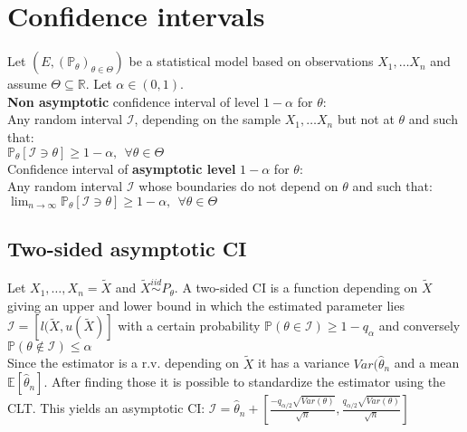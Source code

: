 \section{Confidence intervals}

Let $\displaystyle ( E,(\mathbb{P}_{\theta })_{\theta \in \Theta })$ be a statistical  model based on observations $X_{1} , \ldots X_{n}$  and assume $\displaystyle \Theta \subseteq \mathbb{R}$. Let $\displaystyle \alpha \in ( 0,1)$.\\

\textbf{Non asymptotic} confidence interval of level $\displaystyle 1-\alpha $ for $\displaystyle \theta $:\\

Any random interval $\displaystyle \mathcal{I}$, depending on the sample $X_{1} , \ldots X_{n}$ but not at $\displaystyle \theta $ and such that:\\

$\mathbb{P}_{\theta }[\mathcal{I} \ni \theta ] \geq 1-\alpha ,\ \ \forall \theta \in \Theta$\\

Confidence interval of \textbf{asymptotic level} $\displaystyle 1-\alpha $  for $\displaystyle \theta $:\\

Any random interval $\displaystyle \mathcal{I}$ whose boundaries do not depend on $\displaystyle \theta $ and such that:\\

$\lim _{n\rightarrow \infty }\mathbb{P}_{\theta } [\mathcal{I} \ni \theta ]\geq 1-\alpha ,\ \ \forall \theta \in \Theta $\\

\subsection*{Two-sided asymptotic CI}
Let $X_1, \ldots, X_n = \tilde{X}$ and $\tilde{X}\stackrel{iid} {\sim} P_{\theta}$. A two-sided CI is a function depending on $\tilde{X}$ giving an upper and lower bound in which the estimated parameter lies $\mathcal{I} = [l(\tilde{X},u(\tilde{X})]$ with a certain probability $\mathbb{P}(\theta \in  \mathcal{I}) \geq 1 -q_{\alpha}$ and conversely $\mathbb{P}(\theta \not\in  \mathcal{I}) \leq \alpha$\\

Since the estimator is a r.v. depending on $\tilde{X}$ it has a variance $Var(\hat{\theta}_n$ and a mean $\mathbb{E}[\hat{\theta}_n]$. After finding those it is possible to standardize the estimator using the CLT. This yields an asymptotic CI: $\mathcal{I} = \hat{\theta}_n + [\frac{-q_{\alpha /2} \sqrt{Var(\theta)} }{\sqrt{n}}, \frac{q_{\alpha /2} \sqrt{Var(\theta)} }{\sqrt{n}}]$

